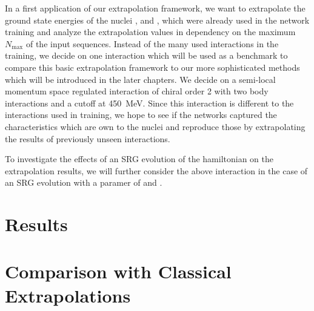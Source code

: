 In a first application of our extrapolation framework, we want to extrapolate the ground state energies of the nuclei ,  and , which were already used in the network training and analyze the extrapolation values in dependency on the maximum $N_\mathrm{max}$ of the input sequences. Instead of the many used interactions in the training, we decide on one interaction which will be used as a benchmark to compare this basic extrapolation framework to our more sophisticated methods which will be introduced in the later chapters. We decide on a semi-local momentum space regulated interaction of chiral order 2 with two body interactions and a cutoff at \SI{450}{\mega\electronvolt}. Since this interaction is different to the interactions used in training, we hope to see if the networks captured the characteristics which are own to the nuclei and reproduce those by extrapolating the results of previously unseen interactions.

To investigate the effects of an SRG evolution of the hamiltonian on the extrapolation results, we will further consider the above interaction in the case of an SRG evolution with a paramer of  and .

\section{Results}

\section{Comparison with Classical Extrapolations}

